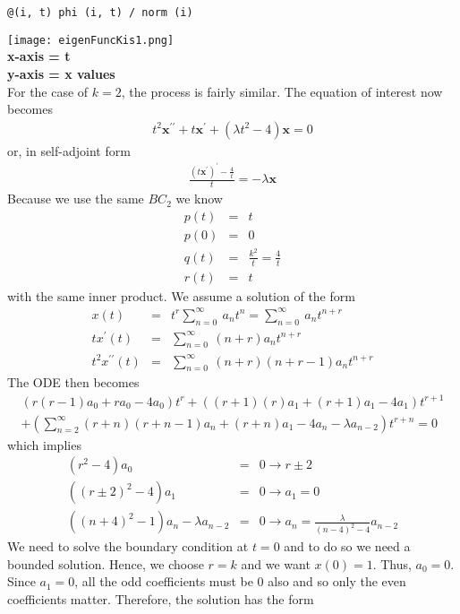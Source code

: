 \documentclass[11pt]{SelfArxOneColBMN}
\begin{document}
\begin{exercise}
\begin{solution}
\begin{lstlisting}
@(i, t) phi (i, t) / norm (i)    
    \end{lstlisting}
    \texttt{[image: eigenFuncKis1.png]}\\
    \centering
    \textbf{x-axis = t}\\
    \textbf{y-axis = x values}\\
    For the case of $k = 2$, the process is fairly similar. The equation of interest now becomes
    \begin{eqnarray*}
      t^2\mathbf{x}^{\prime\prime} + t\mathbf{x}^\prime + (\lambda t^2 - 4)\mathbf{x} = 0
    \end{eqnarray*}
    or, in self-adjoint form
    \begin{eqnarray*}
      \frac{(t\mathbf{x}^\prime)^\prime - \frac{4}{t}}{t} = -\lambda\mathbf{x}
    \end{eqnarray*}
    Because we use the same $BC_2$ we know
    \begin{eqnarray*}
      p(t) &=& t\\
      p(0) &=& 0\\
      q(t) &=& \frac{k^2}{t} = \frac{4}{t}\\
      r(t) &=& t
    \end{eqnarray*}
    with the same inner product. We assume a solution of the form
    \begin{eqnarray*}
      x(t) &=& t^r\sum_{n=0}^\infty\:a_nt^n = \sum_{n=0}^\infty\:a_nt^{n + r}\\
      tx^\prime(t) &=& \sum_{n=0}^\infty\:(n + r)a_nt^{n + r}\\
      t^2x^{\prime\prime}(t) &=& \sum_{n=0}^\infty\:(n + r)(n + r - 1)a_nt^{n + r}
    \end{eqnarray*}
    The ODE then becomes
    \begin{eqnarray*}
      (r(r - 1)a_0 + ra_0 - 4a_0)t^r + ((r + 1)(r)a_1 + (r + 1)a_1 - 4a_1)t^{r + 1}\\
       + (\sum_{n = 2}^\infty(r + n)(r + n - 1)a_n + (r + n)a_1 - 4a_n - \lambda a_{n - 2})t^{r + n} = 0
    \end{eqnarray*}
    which implies 
    \begin{eqnarray*}
      (r^2 - 4)a_0 &=& 0 \rightarrow r \pm 2\\
      ((r \pm 2)^2 - 4)a_1 &=& 0 \rightarrow a_1 = 0\\
      ((n + 4)^2 - 1)a_n - \lambda a_{n-2} &=& 0 \rightarrow a_n = \frac{\lambda}{(n - 4)^2 - 4}a_{n - 2}
    \end{eqnarray*}
    We need to solve the boundary condition at $t = 0$ and to do so we need a bounded solution. Hence, we choose $r = k$ and we want $x(0) = 1$. Thus, $a_0 = 0$. Since $a_1 = 0$, all the odd coefficients must be 0 also and so only the even coefficients matter. Therefore, the solution has the form

\end{solution}
\end{exercise}
\end{document}
